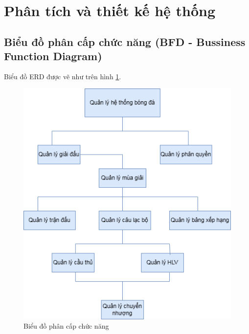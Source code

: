 \documentclass[../BTL.tex]{subfiles}
\begin{document}
\section{Phân tích và thiết kế hệ thống}
\subsection{Biểu đồ phân cấp chức năng (BFD - Bussiness Function Diagram)}
Biểu đồ ERD được vẽ như trên hình \ref{fig:BFD_LTW}.
\begin{figure}
    \centering
    \includegraphics[width=0.8\linewidth]{Hinhve/BFD_LTW.png}
    \caption{Biểu đồ phân cấp chức năng}
    \label{fig:BFD_LTW}
\end{figure}
\end{document}
